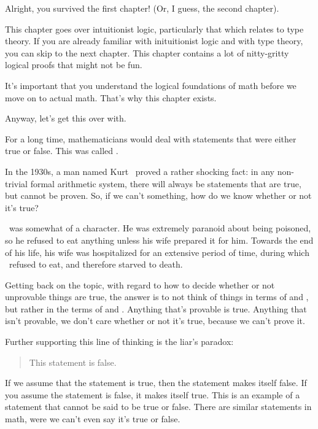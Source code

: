 \label{ch:props}
\label{props}
\label{ch:logic}
\label{logic}

Alright, you survived the first chapter! (Or, I guess, the second
chapter).

This chapter goes over intuitionist logic, particularly that which relates to
type theory. If you are already familiar with inituitionist logic and with type
theory, you can skip to the next chapter. This chapter contains a lot of
nitty-gritty logical proofs that might not be fun.

It's important that you understand the logical foundations of math before we
move on to actual math. That's why this chapter exists.

Anyway, let's get this over with.

For a long time, mathematicians would deal with statements that were either
true or false. This was called . 

In the 1930s, a man named Kurt \godel\ proved a rather shocking fact: in any
non-trivial formal arithmetic system, there will always be statements that are
true, but cannot be proven. So, if we can't  something, how do we
know whether or not it's true?

\godel\ was somewhat of a character. He was extremely paranoid about being
poisoned, so he refused to eat anything unless his wife prepared it for him.
Towards the end of his life, his wife was hospitalized for an extensive period
of time, during which \godel\ refused to eat, and therefore starved to
death. \cite{w-godel}

Getting back on the topic, with regard to how to decide whether or not
unprovable things are true, the answer is to not think of things in terms of
 and , but rather in the terms of  and
. Anything that's provable is true. Anything that isn't
provable, we don't care whether or not it's true, because we can't prove it.
\nocite{w-godel-incompleteness}

Further supporting this line of thinking is the liar's paradox:

\begin{quote}
    This statement is false.
\end{quote}

If we assume that the statement is true, then the statement makes itself
false. If you assume the statement is false, it makes itself true. This is an
example of a statement that cannot be said to be true or false. There are
similar statements in math, were we can't even say it's true or false.


